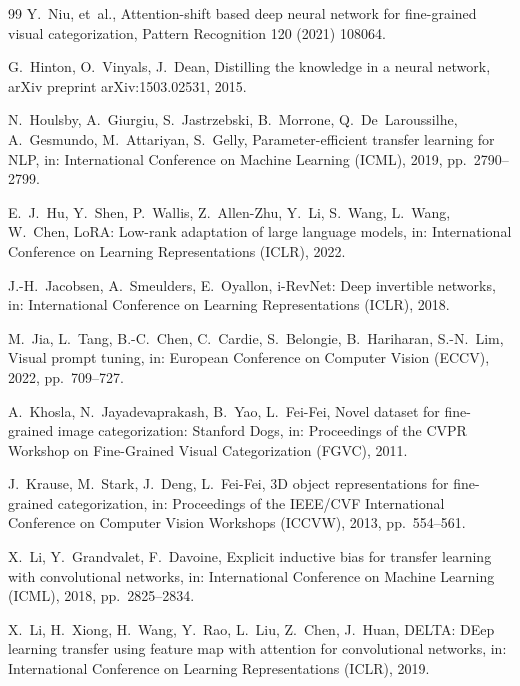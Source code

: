 \documentclass[review,12pt,authoryear]{elsarticle}
\begin{document}
\begin{thebibliography}{99}
Y.~Niu, et~al.,
Attention-shift based deep neural network for fine-grained visual categorization,
Pattern Recognition 120 (2021) 108064.

G.~Hinton, O.~Vinyals, J.~Dean,
Distilling the knowledge in a neural network,
arXiv preprint arXiv:1503.02531, 2015.

N.~Houlsby, A.~Giurgiu, S.~Jastrzebski, B.~Morrone, Q.~De~Laroussilhe, A.~Gesmundo, M.~Attariyan, S.~Gelly,
Parameter-efficient transfer learning for NLP,
in: International Conference on Machine Learning (ICML), 2019, pp.~2790--2799.

E.~J.~Hu, Y.~Shen, P.~Wallis, Z.~Allen-Zhu, Y.~Li, S.~Wang, L.~Wang, W.~Chen,
LoRA: Low-rank adaptation of large language models,
in: International Conference on Learning Representations (ICLR), 2022.

J.-H.~Jacobsen, A.~Smeulders, E.~Oyallon,
i-RevNet: Deep invertible networks,
in: International Conference on Learning Representations (ICLR), 2018.

M.~Jia, L.~Tang, B.-C.~Chen, C.~Cardie, S.~Belongie, B.~Hariharan, S.-N.~Lim,
Visual prompt tuning,
in: European Conference on Computer Vision (ECCV), 2022, pp.~709--727.

A.~Khosla, N.~Jayadevaprakash, B.~Yao, L.~Fei-Fei,
Novel dataset for fine-grained image categorization: Stanford Dogs,
in: Proceedings of the CVPR Workshop on Fine-Grained Visual Categorization (FGVC), 2011.

J.~Krause, M.~Stark, J.~Deng, L.~Fei-Fei,
3D object representations for fine-grained categorization,
in: Proceedings of the IEEE/CVF International Conference on Computer Vision Workshops (ICCVW), 2013, pp.~554--561.

X.~Li, Y.~Grandvalet, F.~Davoine,
Explicit inductive bias for transfer learning with convolutional networks,
in: International Conference on Machine Learning (ICML), 2018, pp.~2825--2834.

X.~Li, H.~Xiong, H.~Wang, Y.~Rao, L.~Liu, Z.~Chen, J.~Huan,
DELTA: DEep learning transfer using feature map with attention for convolutional networks,
in: International Conference on Learning Representations (ICLR), 2019.


\end{thebibliography}
\end{document}
